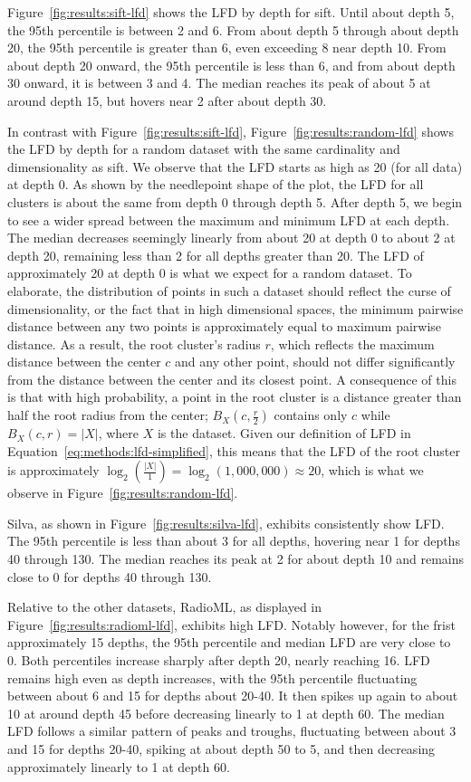 Figure~\ref{fig:results:sift-lfd} shows the LFD by depth for sift. 
Until about depth 5, the 95th percentile is between 2 and 6. From about depth 5 through about depth 20, the 95th percentile is greater than 6, even exceeding 8 near depth 10. 
From about depth 20 onward, the 95th percentile is less than 6, and from about depth 30 onward, it is between 3 and 4. 
The median reaches its peak of about 5 at around depth 15, but hovers near 2 after about depth 30. 


In contrast with Figure~\ref{fig:results:sift-lfd}, Figure~\ref{fig:results:random-lfd} shows the LFD by depth for a random dataset with the same cardinality and dimensionality as sift. 
We observe that the LFD starts as high as 20 (for all data) at depth 0. As shown by the needlepoint shape of the plot, the LFD for all clusters 
is about the same from depth 0 through depth 5. 
After depth 5, we begin to see a wider spread between the maximum and minimum LFD at each depth. 
The median decreases seemingly linearly from about 20 at depth 0 to about 2 at depth 20, remaining less than 2 for all depths greater than 20.
The LFD of approximately 20 at depth 0 is what we expect for a random dataset.
To elaborate, the distribution of points in such a dataset should reflect the curse of dimensionality, or the fact that in high dimensional spaces, the minimum pairwise distance between any two points is approximately equal to maximum pairwise distance. 
As a result, the root cluster's radius $r$, which reflects the maximum distance between the center $c$ and any other point, should not differ significantly from the distance between the center and its closest point. 
A consequence of this is that with high probability, a point in the root cluster is a distance greater than half the root radius from the center; $B_X(c, \tfrac{r}{2})$ contains only $c$ while $B_X(c, r) = |X|$, where $X$ is the dataset. 
Given our definition of LFD in Equation~\ref{eq:methods:lfd-simplified}, this means that the LFD of the root cluster is approximately $\log_2(\frac{|X|}{1}) = \log_2(1,000,000) \approx 20$, which is what we observe in Figure~\ref{fig:results:random-lfd}.




Silva, as shown in Figure~\ref{fig:results:silva-lfd}, exhibits consistently show LFD.
The 95th percentile is less than about 3 for all depths, hovering near 1 for depths 40 through 130. 
The median reaches its peak at 2 for about depth 10 and remains close to 0 for depths 40 through 130. 


Relative to the other datasets, RadioML, as displayed in Figure~\ref{fig:results:radioml-lfd}, exhibits high LFD. 
Notably however, for the frist approximately 15 depths, the 95th percentile and median LFD are very close to 0. 
Both percentiles increase sharply after depth 20, nearly reaching 16. 
LFD remains high even as depth increases, with the 95th percentile fluctuating between about 6 and 15 for depths about 20-40. 
It then spikes up again to about 10 at around depth 45 before decreasing linearly to 1 at depth 60. 
The median LFD follows a similar pattern of peaks and troughs, fluctuating between about 3 and 15 for depths 20-40, spiking at about depth 50 to 5, and then decreasing approximately linearly to 1 at depth 60.

